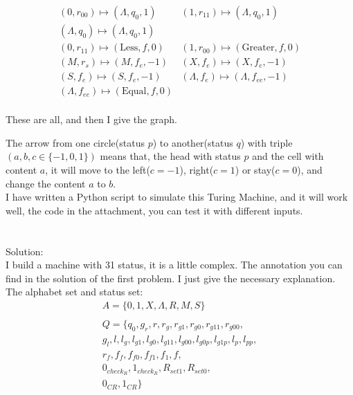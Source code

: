 \documentclass[a4papper]{article}
\theoremstyle{neosn}
\begin{document}
\begin{enumerate}
\[            \begin{array}{ll}
            (0, r_{00}) \mapsto (\Lambda, q_0 ,1) & (1, r_{11}) \mapsto (\Lambda, q_0, 1) \\
            (\Lambda, q_0) \mapsto (\Lambda, q_0, 1) & \\
            (0, r_{11}) \mapsto (\text{Less}, f, 0) & (1, r_{00}) \mapsto (\text{Greater}, f, 0) \\
            (M, r_s) \mapsto (M, f_e, -1) & (X, f_e) \mapsto (X, f_e, -1) \\
            (S, f_e) \mapsto (S, f_e, -1) & (\Lambda, f_e) \mapsto (\Lambda, f_{ee}, -1) \\
            (\Lambda, f_{ee}) \mapsto (\text{Equal}, f, 0) & \\
            \end{array}
        \]
    \end{enumerate}

    These are all, and then I give the graph.

    

    The arrow from one circle(status $p$) to another(status $q$)  with triple $(a,b,c \in \{-1,0,1\})$ means that,
    the head with status $p$ and the cell with content $a$, it will move to the left($c=-1$), right($c=1$) or stay($c=0$),
    and change the content $a$ to $b$. \\

    I have written a Python script to simulate this Turing Machine, and it will work well,
    the code in the attachment, you can test it with different inputs. \\
    \\

    \\

    Solution: \\

    I build a machine with 31 status, it is a little complex.
    The annotation you can find in the solution of the first problem.
    I just give the necessary explanation. \\

    The alphabet set and status set:
    \begin{gather*}
        A = \{0,1,X, \Lambda, R, M, S\} \\
        \\
        Q = \{q_0, g_r, r, r_g, r_{g1}, r_{g0},r_{g11}, r_{g00}, \\
        g_l, l, l_g,l_{g1}, l_{g0}, l_{g11}, l_{g00},l_{g0p}, l_{g1p}, l_p, l_{pp},\\
        r_f, f_f, f_{f0}, f_{f1}, f_1, f,\\
        0_{check_R}, 1_{check_R}, R_{set1}, R_{set0},\\
        0_{CR}, 1_{CR}\}\\
    \end{gather*}
\end{document}
